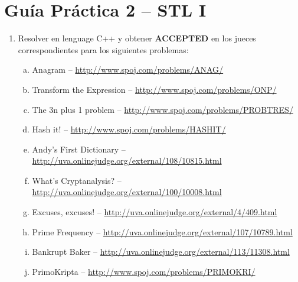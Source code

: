 




\section*{Gu\'ia Pr\'actica 2 -- STL I}

\begin{enumerate}[1 -]
	
	\item Resolver en lenguage C++ y obtener \textbf{ACCEPTED} en los jueces correspondientes para los siguientes problemas:
	
	\begin{enumerate}[a)]
		\item Anagram -- \href{http://www.spoj.com/problems/ANAG/}{http://www.spoj.com/problems/ANAG/}
		\item Transform the Expression -- \href{http://www.spoj.com/problems/ONP/}{http://www.spoj.com/problems/ONP/}
        \item The 3n plus 1 problem -- \href{http://www.spoj.com/problems/PROBTRES/}{http://www.spoj.com/problems/PROBTRES/}
		\item Hash it! -- \href{http://www.spoj.com/problems/HASHIT/}{http://www.spoj.com/problems/HASHIT/}
		\item Andy’s First Dictionary -- \href{http://uva.onlinejudge.org/external/108/10815.html}{http://uva.onlinejudge.org/external/108/10815.html}
		\item What's Cryptanalysis? -- \href{http://uva.onlinejudge.org/external/100/10008.html}{http://uva.onlinejudge.org/external/100/10008.html}
		\item Excuses, excuses! -- \href{http://uva.onlinejudge.org/external/4/409.html}{http://uva.onlinejudge.org/external/4/409.html}
		\item Prime Frequency -- \href{http://uva.onlinejudge.org/external/107/10789.html}{http://uva.onlinejudge.org/external/107/10789.html}
		\item Bankrupt Baker -- \href{http://uva.onlinejudge.org/external/113/11308.html}{http://uva.onlinejudge.org/external/113/11308.html}
		\item PrimoKripta -- \href{http://www.spoj.com/problems/PRIMOKRI/}{http://www.spoj.com/problems/PRIMOKRI/}
	\end{enumerate}

\end{enumerate}






